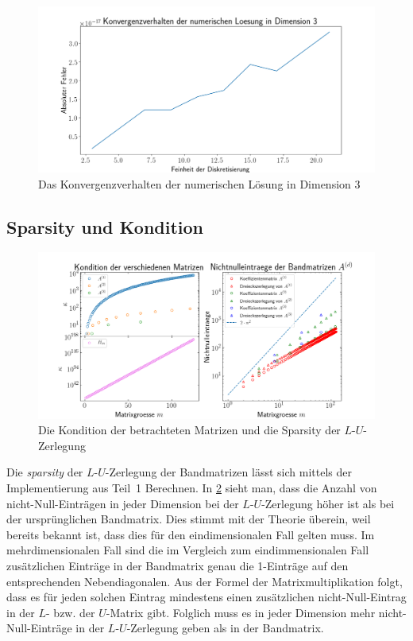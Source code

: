 \documentclass[smallheadings]{scrartcl}
\numberwithin{equation}{section}
\begin{document}
\begin{figure}[H]
	\centering
	\includegraphics[width=\linewidth]{Bericht/Bilder2/konvdim3}
	\caption{Das Konvergenzverhalten der numerischen Lösung in Dimension 3}
	\label{fig:konvdim3}
\end{figure}

\subsection{Sparsity und Kondition}

\begin{figure}[H]
	\centering
	\includegraphics[width=\linewidth]{Bericht/Bilder2/sparsekon}
	\caption{Die Kondition der betrachteten Matrizen und die Sparsity der $L$-$U$-Zerlegung}
	\label{fig:sparsekon}
\end{figure}

Die \textit{sparsity} der $L$-$U$-Zerlegung der Bandmatrizen lässt sich mittels der Implementierung aus Teil~1 Berechnen. In \ref{fig:sparsekon} sieht man, dass die Anzahl von nicht-Null-Einträgen in jeder Dimension bei der $L$-$U$-Zerlegung höher ist als bei der ursprünglichen Bandmatrix. Dies stimmt mit der Theorie überein, weil bereits bekannt ist, dass dies für den eindimensionalen Fall gelten muss. Im mehrdimensionalen Fall sind die im Vergleich zum eindimmensionalen Fall zusätzlichen Einträge in der Bandmatrix genau die 1-Einträge auf den entsprechenden Nebendiagonalen. Aus der Formel der Matrixmultiplikation folgt, dass es für jeden solchen Eintrag mindestens einen zusätzlichen nicht-Null-Eintrag in der $L$- bzw. der $U$-Matrix gibt. Folglich muss es in jeder Dimension mehr nicht-Null-Einträge in der $L$-$U$-Zerlegung geben als in der Bandmatrix.
\end{document}
